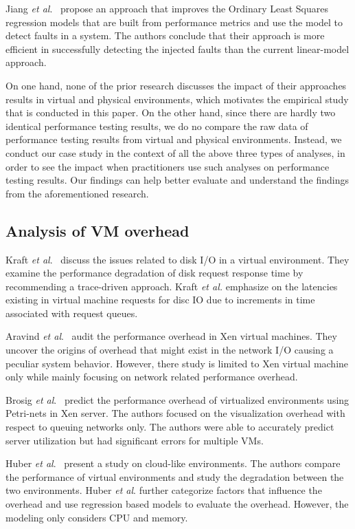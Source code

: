 \documentclass[smallextended]{svjour3}       %
\begin{document}
Jiang \emph{et al$.$}~\cite{Jiang:2009:SMM:1555228.1555233} propose an approach that improves the Ordinary Least Squares regression models that are built from performance metrics and use the model to detect faults in a system. The authors conclude that their approach is more efficient in successfully detecting the injected faults than the current linear-model approach.

On one hand, none of the prior research discusses the impact of their approaches results in virtual and physical environments, which motivates the empirical study that is conducted in this paper. On the other hand, since there are hardly two identical performance testing results, we do no compare the raw data of performance testing results from virtual and physical environments. Instead, we conduct our case study in the context of all the above three types of analyses, in order to see the impact when practitioners use such analyses on performance testing results. Our findings can help better evaluate and understand the findings from the aforementioned research. 



\subsection{Analysis of VM overhead}

Kraft \textit{et al$.$}~\cite{kraft2011io} discuss the issues related to disk I/O in a virtual environment. They examine the performance degradation of disk request response time by recommending a trace-driven approach. Kraft \textit{et al.} emphasize on the latencies existing in virtual machine requests for disc IO due to increments in time associated with request queues. 

Aravind \textit{et al$.$}~\cite{menon2005diagnosing} audit the performance overhead in Xen virtual machines. They uncover the origins of overhead that might exist in the network I/O causing a peculiar system behavior. However, there study is limited to Xen virtual machine only while mainly focusing on network related performance overhead.

Brosig \textit{et al$.$}~\cite{brosig2013evaluating} predict the performance overhead of virtualized environments using Petri-nets in Xen server. The authors focused on the visualization overhead with respect to queuing networks only. The authors were able to accurately predict server utilization but had significant errors for multiple VMs.


Huber \textit{et al$.$}~\cite{huber2011evaluating} present a study on cloud-like environments. The authors compare the performance of virtual environments and study the degradation between the two environments. Huber \textit{et al$.$} further categorize factors that influence the overhead and use regression based models to evaluate the overhead. However, the modeling only considers CPU and memory.
\end{document}
